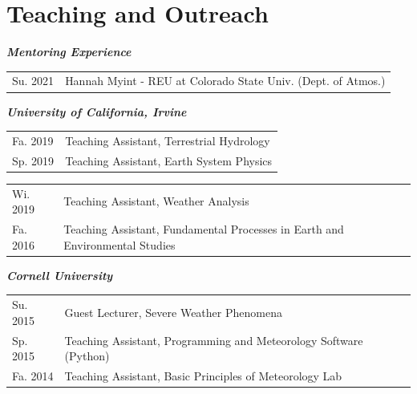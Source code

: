 \documentclass[margin,line,palatino,courier,10pt]{res}
\begin{document}
\begin{resume}
\vspace{-0.1in}
\noindent\textcolor{Cerulean}{\makebox[\linewidth][r]{\rule{\textwidth}{5pt}}}
\vspace{-0.3in}

\section{\sc \textcolor{Cerulean}{\large{\textbf{Teaching and Outreach}}}}

\textit{\textbf{Mentoring Experience}}
\vspace*{0.05in}\\
\begin{tabular}{@{}p{0.9in}p{4in}}
Su. 2021 & Hannah Myint - REU at Colorado State Univ. (Dept. of Atmos.)
\end{tabular}

\textit{\textbf{University of California, Irvine}}
\vspace*{0.05in}\\
\begin{tabular}{@{}p{0.9in}p{4in}}
Fa. 2019 & Teaching Assistant, Terrestrial Hydrology\\
Sp. 2019 & Teaching Assistant, Earth System Physics\\
\end{tabular}
\begin{tabular}{@{}p{0.9in}p{4in}}
Wi. 2019 & Teaching Assistant, Weather Analysis\\
Fa. 2016 & Teaching Assistant, Fundamental Processes in Earth and Environmental Studies\\
\end{tabular}

\textit{\textbf{Cornell University}}
\vspace*{0.05in}\\
\begin{tabular}{@{}p{0.9in}p{4in}}
Su. 2015 & Guest Lecturer, Severe Weather Phenomena\\
Sp. 2015 & Teaching Assistant, Programming and Meteorology Software (Python)\\
Fa. 2014 & Teaching Assistant, Basic Principles of Meteorology Lab\\
\end{tabular}


\end{resume}
\end{document}
